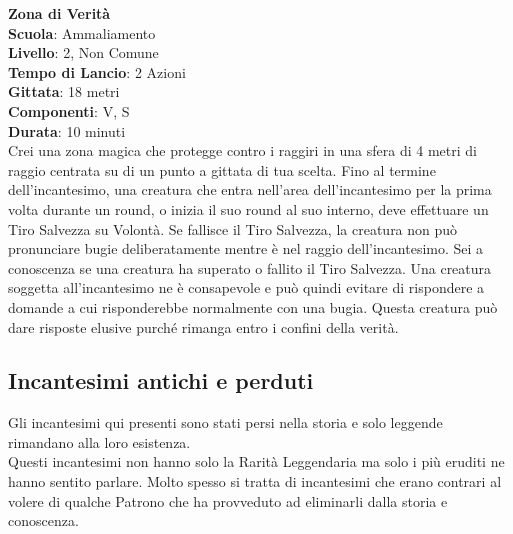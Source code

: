 \begin{multicols}{2}
\medskip\textbf{Zona di Verità}\\
\textbf{Scuola}: Ammaliamento\\
\textbf{Livello}: 2, Non Comune\\
\textbf{Tempo di Lancio}: 2 Azioni\\
\textbf{Gittata}: 18 metri\\
\textbf{Componenti}: V, S\\
\textbf{Durata}: 10 minuti\\
Crei una zona magica che protegge contro i raggiri in una sfera di 4 metri di raggio centrata su di un punto a gittata di tua scelta. Fino al termine dell'incantesimo, una creatura che entra nell'area dell'incantesimo per la prima volta durante un round, o inizia il suo round al suo interno, deve effettuare un Tiro Salvezza su Volontà. Se fallisce il Tiro Salvezza, la creatura non può pronunciare bugie deliberatamente mentre è nel raggio dell'incantesimo. Sei a conoscenza se una creatura ha superato o fallito il Tiro Salvezza. Una creatura soggetta all'incantesimo ne è consapevole e può quindi evitare di rispondere a domande a cui risponderebbe normalmente con una bugia. Questa creatura può dare risposte elusive purché rimanga entro i confini della verità.

\end{multicols}



\pagebreak

\subsection{Incantesimi antichi e perduti}

Gli incantesimi qui presenti sono stati persi nella storia e solo leggende rimandano alla loro esistenza.\\
Questi incantesimi non hanno solo la Rarità Leggendaria ma solo i più eruditi ne hanno sentito parlare. Molto spesso si tratta di incantesimi che erano contrari al volere di qualche Patrono che ha provveduto ad eliminarli dalla storia e conoscenza.

